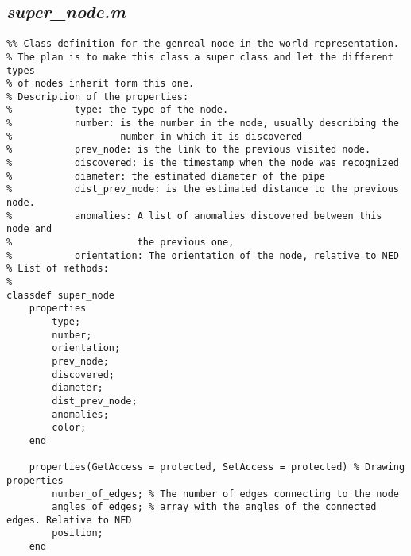 \subsection{\emph{super\_node.m}}

\begin{lstlisting}
%% Class definition for the genreal node in the world representation. 
% The plan is to make this class a super class and let the different types
% of nodes inherit form this one.
% Description of the properties:
%           type: the type of the node.
%           number: is the number in the node, usually describing the
%                   number in which it is discovered
%           prev_node: is the link to the previous visited node.
%           discovered: is the timestamp when the node was recognized
%           diameter: the estimated diameter of the pipe
%           dist_prev_node: is the estimated distance to the previous node.
%           anomalies: A list of anomalies discovered between this node and
%                      the previous one,
%           orientation: The orientation of the node, relative to NED
% List of methods:
%           
classdef super_node
    properties
        type;
        number;
        orientation;
        prev_node;
        discovered;
        diameter;
        dist_prev_node;
        anomalies;
        color;
    end
    
    properties(GetAccess = protected, SetAccess = protected) % Drawing properties
        number_of_edges; % The number of edges connecting to the node
        angles_of_edges; % array with the angles of the connected edges. Relative to NED
        position;
    end
    

\end{lstlisting}
